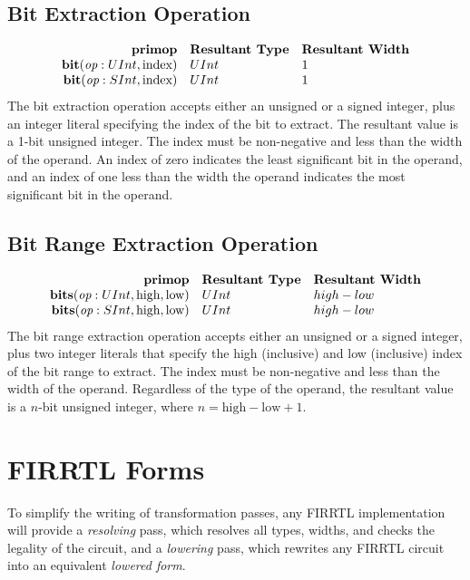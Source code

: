 \documentclass[12pt]{article}
\begin{document}
\subsection{Bit Extraction Operation}
\[
\begin{array}{rll}
\text{\bf primop} & \text{\bf Resultant Type} & \text{\bf Resultant Width} \\
\text{\bf bit}(\text{\em op}:UInt, \text{index})  & UInt & 1    \\
\text{\bf bit}(\text{\em op}:SInt, \text{index})  & UInt & 1    \\
\end{array}
\]
The bit extraction operation accepts either an unsigned or a signed integer, plus an integer literal specifying the index of the bit to extract.
The resultant value is a 1-bit unsigned integer.
The index must be non-negative and less than the width of the operand.
An index of zero indicates the least significant bit in the operand, and an index of one less than the width the operand indicates the most significant bit in the operand.

\subsection{Bit Range Extraction Operation}
\[
\begin{array}{rll}
\text{\bf primop} & \text{\bf Resultant Type} & \text{\bf Resultant Width} \\
\text{\bf bits}(\text{\em op}:UInt, \text{high}, \text{low})  & UInt & high - low    \\
\text{\bf bits}(\text{\em op}:SInt, \text{high}, \text{low})  & UInt & high - low    \\
\end{array}
\]
The bit range extraction operation accepts either an unsigned or a signed integer, plus two integer literals that specify the high (inclusive) and low (inclusive) index of the bit range to extract.
The index must be non-negative and less than the width of the operand.
Regardless of the type of the operand, the resultant value is a $n$-bit unsigned integer, where $n = \text{high} - \text{low} + 1$. 

\section{FIRRTL Forms}

To simplify the writing of transformation passes, any FIRRTL implementation will provide a {\em resolving} pass, which resolves all types, widths, and checks the legality of the circuit, and a {\em lowering} pass, which rewrites any FIRRTL circuit into an equivalent {\em lowered form}.
\end{document}
